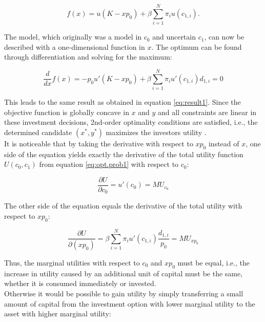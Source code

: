 \begin{equation}
    f(x) = u(K - xp_0) + \beta \sum_{i=1}^{N} \pi_i u(c_{1,i}).
\end{equation}

\bigskip

\noindent The model, which originally was a model in $c_0$ and uncertain $c_1$, can now be described with a one-dimensional function in $x$. The optimum can be found through differentiation and solving for the maximum:

\begin{equation}
    \frac{d}{dx} f(x) = -p_0 u'(K - xp_0) + \beta \sum_{i=1}^{N} \pi_i u'(c_{1,i}) d_{1,i} = 0
\end{equation}

\bigskip

\noindent This leads to the same result as obtained in equation \eqref{eq:result1}. Since the objective function is globally concave in $x$ and $y$ and all constraints are linear in these investment decisions, 2nd-order optimality conditions are satisfied, i.e., the determined candidate $(x^*,y^*)$ maximizes the investors utility \citep[p. 131]{dangl2022bwopt}.\\

\noindent It is noticeable that by taking the derivative with respect to $xp_0$ instead of $x$, one side of the equation yields exactly the derivative of the total utility function $U(c_0, c_1)$ from equation \eqref{eq:opt.prob1} with respect to $c_0$:

\begin{equation}
    \frac{\partial U}{\partial c_0} = u'(c_0) = MU_{c_0}
\end{equation}

\bigskip

\noindent The other side of the equation equals the derivative of the total utility with respect to $xp_0$:

\begin{equation}
    \frac{\partial U}{\partial (xp_0)} = \beta \sum_{i=1}^{N} \pi_i u'(c_{1,i}) \frac{d_{1,i}}{p_0} = MU_{xp_0}
\end{equation}

\bigskip

\noindent Thus, the marginal utilities with respect to $c_0$ and $xp_0$ must be equal, i.e., the increase in utility caused by an additional unit of capital must be the same, whether it is consumed immediately or invested.\\
Otherwise it would be possible to gain utility by simply transferring a small amount of capital from the investment option with lower marginal utility to the asset with higher marginal utility:

